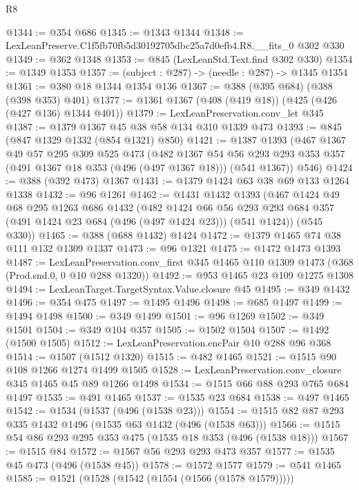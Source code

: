 \begin{lexlean}{R8}
\begin{coremodule}
@1344 := @354 @686
@1345 := @1343 @1344
@1348 := LexLeanPreserve.C1f5fb70fb5d30192705dbc25a7d0efb4.R8.__fits_0 @302 @330
@1349 := @362 @1348
@1353 := @845 (LexLeanStd.Text.find @302 @330)
@1354 := @1349 @1353
@1357 := (subject : @287) -> (needle : @287) -> @1345 @1354
@1361 := @380 @18 @1344 @1354 @136
@1367 := @388 (@395 @684) (@388 (@398 @353) @401)
@1377 := @1361 @1367 (@408 (@419 @18)) (@425 (@426 (@427 @136) @1344 @401))
@1379 := LexLeanPreservation.conv_let @345
@1387 := @1379 @1367 @45 @38 @58 @134 @310 @1339 @473
@1393 := @845 (@847 @1329 @1332 (@854 @1321) @850)
@1421 := @1387
    @1393
    (@467
      @1367
      @49
      @57
      @295
      @309
      @525
      @473
      (@482
        @1367
        @54
        @56
        @293
        @293
        @353
        @357
        (@491 @1367 @18 @353 (@496 (@497 @1367 @18)))
        (@541 @1367))
      @546)
@1424 := @388 (@392 @473) @1367
@1431 := @1379 @1424 @63 @38 @69 @133 @1264 @1338
@1432 := @96 @1261
@1462 := @1431
    @1432
    @1393
    (@467
      @1424
      @49
      @68
      @295
      @1263
      @686
      @1432
      (@482
        @1424
        @66
        @56
        @293
        @293
        @684
        @357
        (@491 @1424 @23 @684 (@496 (@497 @1424 @23)))
        (@541 @1424))
      (@545 @330))
@1465 := @388 (@688 @1432) @1424
@1472 := @1379 @1465 @74 @38 @111 @132 @1309 @1337
@1473 := @96 @1321
@1475 := @1472 @1473 @1393
@1487 := LexLeanPreservation.conv_first
    @345
    @1465
    @110
    @1309
    @1473
    (@368 (Prod.snd.{0, 0} @10 @288 @1320))
@1492 := @953 @1465 @23 @109 @1275 @1308
@1494 := LexLeanTarget.TargetSyntax.Value.closure @45
@1495 := @349 @1432
@1496 := @354 @475
@1497 := @1495 @1496
@1498 := @685 @1497
@1499 := @1494 @1498
@1500 := @349 @1499
@1501 := @96 @1269
@1502 := @349 @1501
@1504 := @349 @104 @357
@1505 := @1502 @1504
@1507 := @1492 (@1500 @1505)
@1512 := LexLeanPreservation.encPair @10 @288 @96 @368
@1514 := @1507 (@1512 @1320)
@1515 := @482 @1465
@1521 := @1515 @90 @108 @1266 @1274 @1499 @1505
@1528 := LexLeanPreservation.conv_closure @345 @1465 @45 @89 @1266 @1498
@1534 := @1515 @66 @88 @293 @765 @684 @1497
@1535 := @491 @1465
@1537 := @1535 @23 @684
@1538 := @497 @1465
@1542 := @1534 (@1537 (@496 (@1538 @23)))
@1554 := @1515 @82 @87 @293 @335 @1432 @1496 (@1535 @63 @1432 (@496 (@1538 @63)))
@1566 := @1515 @54 @86 @293 @295 @353 @475 (@1535 @18 @353 (@496 (@1538 @18)))
@1567 := @1515 @84
@1572 := @1567 @56 @293 @293 @473 @357
@1577 := @1535 @45 @473 (@496 (@1538 @45))
@1578 := @1572 @1577
@1579 := @541 @1465
@1585 := @1521 (@1528 (@1542 (@1554 (@1566 (@1578 @1579)))))

\end{coremodule}
\end{lexlean}

